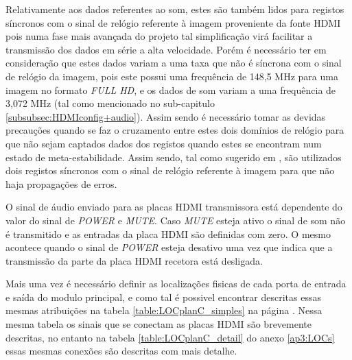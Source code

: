 Relativamente aos dados referentes ao som, estes são também lidos para registos síncronos com o sinal de relógio referente à imagem proveniente da fonte HDMI pois numa fase mais avançada do projeto tal simplificação virá facilitar a transmissão dos dados em série a alta velocidade. Porém é necessário ter em consideração que estes dados variam a uma taxa que não é síncrona com o sinal de relógio da imagem, pois este possui uma frequência de 148,5 MHz para uma imagem no formato \textit{FULL HD}, e os dados de som variam a uma frequência de 3,072 MHz (tal como mencionado no sub-capitulo \ref{subsubsec:HDMIconfig+audio}). Assim sendo é necessário tomar as devidas precauções quando se faz o cruzamento entre estes dois domínios de relógio para que não sejam captados dados dos registos quando estes se encontram num estado de meta-estabilidade. Assim sendo, tal como sugerido em \cite{R024}, são utilizados dois registos síncronos com o sinal de relógio referente à imagem para que não haja propagações de erros.

O sinal de áudio enviado para as placas HDMI transmissora está dependente do valor do sinal de \textit{POWER} e \textit{MUTE}. Caso \textit{MUTE} esteja ativo o sinal de som não é transmitido e as entradas da placa HDMI são definidas com zero. O mesmo acontece quando o sinal de \textit{POWER} esteja desativo uma vez que indica que a transmissão da parte da placa HDMI recetora está desligada.

Mais uma vez é necessário definir as localizações fisicas de cada porta de entrada e saída do modulo principal, e como tal é possivel encontrar descritas essas mesmas atribuições na tabela \ref{table:LOCplanC_simples} na página \pageref{table:LOCplanC_simples}. Nessa mesma tabela os sinais que se conectam as placas HDMI são brevemente descritas, no entanto na tabela \ref{table:LOCplanC_detail} do anexo \ref{ap3:LOCs} essas mesmas conexões são descritas com mais detalhe.

